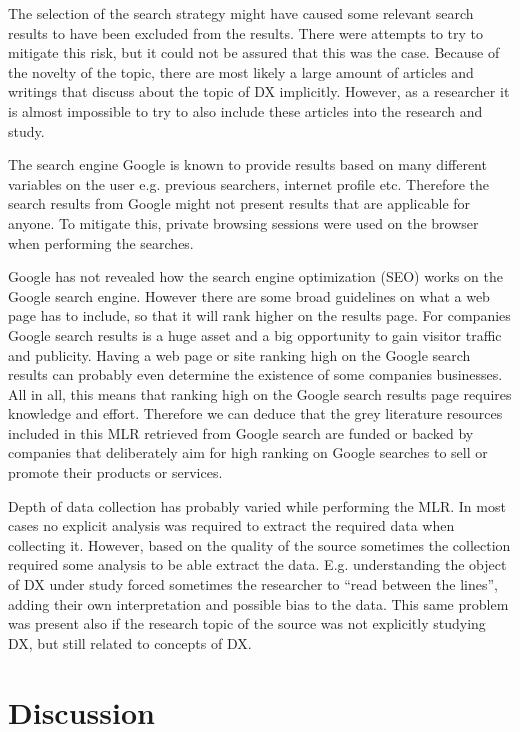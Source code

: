 \documentclass[english, 12pt, a4paper, sci, utf8, a-1b, online]{aaltothesis}
\begin{document}
The selection of the search strategy might have caused some relevant search results to have been excluded from the results. There were attempts to try to mitigate this risk, but it could not be assured that this was the case. Because of the novelty of the topic, there are most likely a large amount of articles and writings that discuss about the topic of DX implicitly. However, as a researcher it is almost impossible to try to also include these articles into the research and study.  

The search engine Google is known to provide results based on many different variables on the user e.g. previous searchers, internet profile etc. Therefore the search results from Google might not present results that are applicable for anyone. To mitigate this, private browsing sessions were used on the browser when performing the searches.

Google has not revealed how the search engine optimization (SEO) works on the Google search engine. However there are some broad guidelines on what a web page has to include, so that it will rank higher on the results page. For companies Google search results is a huge asset and a big opportunity to gain visitor traffic and publicity. Having a web page or site ranking high on the Google search results can probably even determine the existence of some companies businesses. All in all, this means that ranking high on the Google search results page requires knowledge and effort. Therefore we can deduce that the grey literature resources included in this MLR retrieved from Google search are funded or backed by companies that deliberately aim for high ranking on Google searches to sell or promote their products or services.

Depth of data collection has probably varied while performing the MLR. In most cases no explicit analysis was required to extract the required data when collecting it. However, based on the quality of the source sometimes the collection required some analysis to be able extract the data. E.g. understanding the object of DX under study forced sometimes the researcher to ``read between the lines'', adding their own interpretation and possible bias to the data. This same problem was present also if the research topic of the source was not explicitly  studying DX, but still related to concepts of DX.

\clearpage
\section{Discussion} \label{section:discussion}
\end{document}
